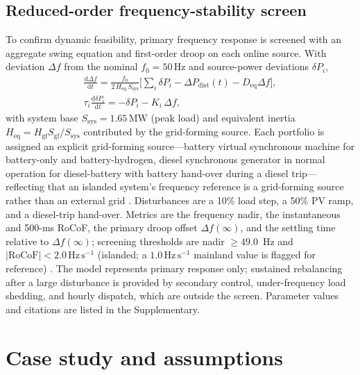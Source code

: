 \documentclass[preprint,12pt]{elsarticle}
\begin{document}
\subsection{Reduced-order frequency-stability screen}
\label{sub:freq}
To confirm dynamic feasibility, primary frequency response is screened with an
aggregate swing equation and first-order droop on each online source. With
deviation $\Delta f$ from the nominal $f_0=50\,\mathrm{Hz}$ and source-power
deviations $\delta P_i$,
\begin{equation}
\label{eq:swing}
\begin{gathered}
\frac{\mathrm d \Delta f}{\mathrm d t} = \frac{f_0}{2\,H_{\mathrm{eq}}\,S_{\mathrm{sys}}}\Big[\textstyle\sum_i \delta P_i - \Delta P_{\mathrm{dist}}(t) - D_{\mathrm{eq}}\Delta f\Big], \\[2pt]
\tau_i\frac{\mathrm d \delta P_i}{\mathrm d t} = -\delta P_i - K_i\,\Delta f,
\end{gathered}
\end{equation}
with system base $S_{\mathrm{sys}}=1.65\,\mathrm{MW}$ (peak load) and equivalent
inertia $H_{\mathrm{eq}}=H_{\mathrm{gf}}S_{\mathrm{gf}}/S_{\mathrm{sys}}$
contributed by the grid-forming source. Each portfolio is assigned an explicit
grid-forming source---battery virtual synchronous machine for
battery-only and battery-hydrogen, diesel synchronous generator
in normal operation for diesel-battery with battery hand-over during a
diesel trip---reflecting that an islanded system's frequency reference is a
grid-forming source rather than an external grid
\cite{liu2016comparison,shahgholian2025droop}. Disturbances are a 10\% load step, a
50\% PV ramp, and a diesel-trip hand-over. Metrics are the frequency nadir, the
instantaneous and 500-ms RoCoF, the primary droop offset $\Delta f(\infty)$, and
the settling time relative to $\Delta f(\infty)$; screening thresholds are nadir
$\ge 49.0$~Hz and $|\mathrm{RoCoF}|<2.0\,\mathrm{Hz\,s^{-1}}$ (islanded; a
$1.0\,\mathrm{Hz\,s^{-1}}$ mainland value is flagged for reference)
\cite{chamorro2020innovative,olasoji2024review}. The model represents primary
response only; sustained rebalancing after a large disturbance is provided by
secondary control, under-frequency load shedding, and hourly dispatch, which are
outside the screen. Parameter values and citations are listed in the Supplementary.

\section{Case study and assumptions}
\label{sec:case}
\end{document}
